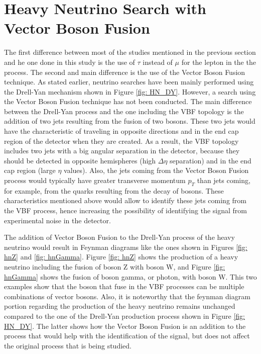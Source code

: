 \section{Heavy Neutrino Search with Vector Boson Fusion}

The first difference between most of the studies mentioned in the previous section and he one done in this study is the use of $\tau$ instead of $\mu$ for the lepton in the the process. The second and main difference is the use of the Vector Boson Fusion technique. As stated earlier, neutrino searches have been mainly performed using the Drell-Yan mechanism shown in Figure \ref{fig: HN_DY}. However, a search using the Vector Boson Fusion technique has not been conducted. The main difference between the Drell-Yan process and the one including the VBF topology is the addition of two jets resulting from the fusion of two bosons. These two jets would have the characteristic of traveling in opposite directions and in the end cap region of the detector when they are created. As a result, the VBF topology includes two jets with a big angular separation in the detector, because they should be detected in opposite hemispheres (high $\Delta \eta$ separation) and in the end cap region (large $\eta$ values). Also, the jets coming from the Vector Boson Fusion process would typically have greater transverse momentum $p_{T}$ than jets coming, for example, from the quarks resulting from the decay of bosons. These characteristics mentioned above would allow to identify these jets coming from the VBF process, hence increasing the possibility of identifying the signal from experimental noise in the detector.

The addition of Vector Boson Fusion to the Drell-Yan process of the heavy neutrino would result in Feynman diagrams like the ones shown in Figures \ref{fig: hnZ} and \ref{fig: hnGamma}. Figure \ref{fig: hnZ} shows the production of a heavy neutrino including the fusion of boson Z with boson W, and Figure \ref{fig: hnGamma} shows the fusion of boson gamma, or photon, with boson W. This two examples show that the boson that fuse in the VBF processes can be multiple combinations of vector bosons. Also, it is noteworthy that the feynman diagram portion regarding the production of the heavy neutrino remains unchanged compared to the one of the Drell-Yan production process shown in Figure \ref{fig: HN_DY}. The latter shows how the Vector Boson Fusion is an addition to the process that would help with the identification of the signal, but does not affect the original process that is being studied. 

